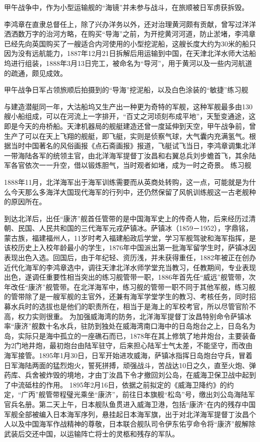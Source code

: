 \documentclass[12pt,UTF8]{ctexbook}
\begin{document}
甲午战争中，作为小型运输舰的“海镜”并未参与战斗，在旅顺被日军虏获拆毁。

李鸿章在直隶总督任上，除了兴办洋务以外，还对治理黄河颇有贡献，曾写过洋洋洒洒数万字的治河方略，在购买“导海”之前，为开挖黄河河道，防止淤堵，李鸿章已经先向英国购买了一艘适合内河使用的小型挖泥船，这艘长度大约为30米的船只因为没有远航能力，1887年12月21日拆解后用运输到中国，在天津北洋水师大沽船坞进行组装，1888年3月13日完工，被命名为“导河”，用于黄河以及一些内河航道的疏通，颇见成效。

甲午战争日军占领旅顺后拍摄到的“导海”挖泥船，以及白色涂装的“敏捷”练习舰

与建造潜艇同一年，大沽船坞又生产出一种更为奇特的军舰，这种军舰最多由130艘小船组成，可以在河流上一字排开，“百丈之河顷刻布成平地”，天堑变通途，这即是今天的舟桥船。天津机器局的舰艇建造还曾一度延伸到天空，甲午战争前，曾生产了可以在天上飞翔的舰艇，即飞艇，实则是侦察气球，大气囊内充满氢气。根据当时中国著名的风俗画报《点石斋画报》报道，飞艇试飞当日，李鸿章调集北洋一带海陆各军的统领主官，由北洋海军提督丁汝昌和右翼总兵刘步蟾首飞，其余陆军各官依次一一升空，借以锻炼胆气，当时观者如堵，成为一时之奇景。
练习舰

1888年11月，北洋海军出于海军训练需要而从英商处转购，这一点，可能就是为什么今天那么多海洋大国现代海军的行列中，还仍然保留了风帆训练舰这一古老舰种的原因所在。

到达北洋后，出任“康济”舰首任管带的是中国海军史上的传奇人物，后来经历过清朝、民国、人民共和国的三代海军元戎萨镇冰。萨镇冰（1859－1952），字鼎铭，蒙古族，福建福州人，11岁时考入福建船政后学堂，学习军舰驾驶和海军指挥，是该校历史上入校年龄最小的学生，1876年中国派出第一批海军留学生时，萨镇冰因表现出色入选。回国后，由于年纪轻、资历浅，并未获得重任，1882年被正在创办近代化海军的李鸿章选中，调往天津北洋水师学堂充当教习，任教期间，专业表现出色，遂调任重要性相当突出的练习舰管带一职，1886年首先任“威远”舰管带，次年改任“康济”舰管带。在北洋海军中，练习舰的管带一职不同于其他军舰，练习舰的管带除了是一艘军舰的主官外，还兼有海军学堂学生的教习、考核任务，同时招募水兵时的选拔也是他们的职责所在，相当于是海上的军校考官，所以尽管官阶不高，权力实则很重。
为加强威海湾的防务，北洋海军提督丁汝昌特别命令萨镇冰率“康济”舰数十名水兵，驻防到独处在威海湾南口海中的日岛炮台之上，日岛名为岛，实际只是海中孤立的一座礁石而已，1878年在其上修筑了地井炮台，主要装备为2门地井炮，最初炮台由陆军驻守，后来担心陆军士气太差，不能坚守，而改由海军接管。1895年1月30日，日军开始进攻威海，萨镇冰指挥日岛炮台守兵，冒着日军海陆两面的猛烈炮火，誓死拼搏，顽强战斗，苦战达10日之久，直至火炮、弹药库、兵舍被炸毁的境地，才由丁汝昌下令才撤回刘公岛，在威海卫保卫战中起到了中流砥柱的作用。
1895年2月16日，依据之前拟定的《威海卫降约》的约定，“广丙”舰管带程璧光乘坐“康济”，前往日本旗舰“松岛”号，缴出刘公岛海陆军官兵名册。第二天上午，日本舰队鱼贯进入威海卫港，包括“康济“在内的残存中国军舰全部被编入日本海军序列，悬挂起日本海军旗，出于对北洋海军提督丁汝昌个人以及中国海军作战精神的尊敬，日本联合舰队司令伊东佑亨命令将“康济”舰解除武装后交还中国，以运输阵亡将士的灵柩和残存的军队。
\end{document}
